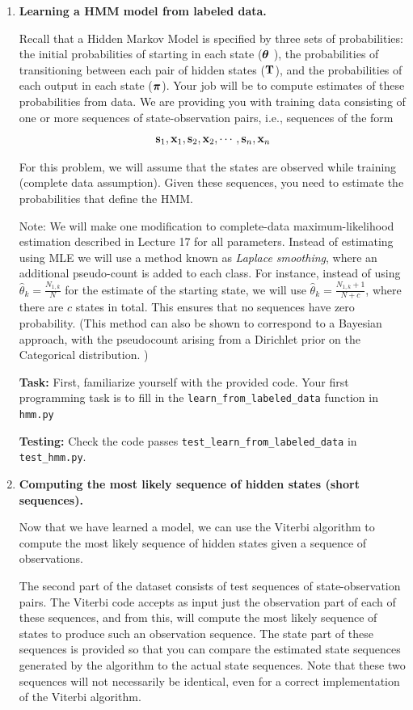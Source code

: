 \documentclass[submit]{harvardml}
\begin{document}
\begin{enumerate}

\item  \textbf{Learning a HMM model from labeled data.}

Recall that a Hidden Markov Model is specified by three sets of
probabilities: the initial probabilities of starting in each state ($\boldsymbol{\theta}$ ),
the probabilities of transitioning between each pair of hidden states ($\mathbf{T}$),
and the probabilities of each output in each state ($\boldsymbol{\pi}$).  Your job will be
to compute estimates of these probabilities from data.  We are
providing you with training data consisting of one or more sequences
of state-observation pairs, i.e., sequences of the form
\[\mathbf{s}_1, \mathbf{x}_1, \mathbf{s}_2, \mathbf{x}_2, \cdots, \mathbf{s}_n, \mathbf{x}_n\]

For this problem, we will assume that the states are observed while
training (complete data assumption).  Given these sequences, you need
to estimate the probabilities that define the HMM. 

Note: We will make one modification to complete-data
maximum-likelihood estimation described in Lecture 17 for all
parameters. Instead of estimating using MLE we will use a method known
as \emph{Laplace smoothing}, where an additional pseudo-count is added
to each class. For instance, instead of using $\hat{\theta}_k =
\frac{N_{1,k}}{N}$ for the estimate of the starting state, we will use
$\hat{\theta}_k = \frac{N_{1,k}+ 1}{N + c}$, where there are $c$
states in total. This ensures that no sequences have zero probability.
(This method can also be shown to correspond to a Bayesian approach,
with the pseudocount arising from a Dirichlet prior on the Categorical
distribution. )

\textbf{Task:} First, familiarize yourself with the provided code. Your first programming
task is to fill in the {\tt learn\_from\_labeled\_data} function in
{\tt hmm.py}  

{\bf Testing:} Check the code passes {\tt test\_learn\_from\_labeled\_data} in {\tt
  test\_hmm.py}.




\item \textbf{Computing the most likely sequence of hidden states (short sequences).}

  Now that we have learned a model, we can use the Viterbi algorithm
  to compute the most likely sequence of hidden states given a
  sequence of observations. 
  
  The second part of the dataset consists of test sequences of
  state-observation pairs.  The Viterbi code accepts as input just the
  observation part of each of these sequences, and from this, will compute
  the most likely sequence of states to produce such an observation
  sequence. The state part of these sequences is provided so that you
  can compare the estimated state sequences generated by the algorithm
  to the actual state sequences.  Note that these two sequences will
  not necessarily be identical, even for a correct implementation of
  the Viterbi algorithm.


\end{enumerate}
\end{document}

